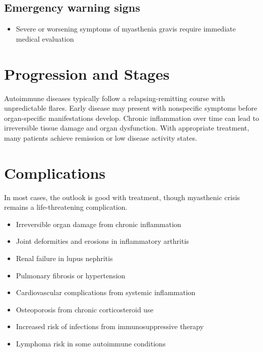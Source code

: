 \subsection{Emergency warning signs}
\begin{itemize}[noitemsep]
  \item Severe or worsening symptoms of myasthenia gravis require immediate medical evaluation
\end{itemize}
\section{Progression and Stages}
Autoimmune diseases typically follow a relapsing-remitting course with unpredictable flares. Early disease may present with nonspecific symptoms before organ-specific manifestations develop. Chronic inflammation over time can lead to irreversible tissue damage and organ dysfunction. With appropriate treatment, many patients achieve remission or low disease activity states.
\section{Complications}
In most cases, the outlook is good with treatment, though myasthenic crisis remains a life-threatening complication.

\begin{itemize}[noitemsep]
  \item Irreversible organ damage from chronic inflammation
  \item Joint deformities and erosions in inflammatory arthritis
  \item Renal failure in lupus nephritis
  \item Pulmonary fibrosis or hypertension
  \item Cardiovascular complications from systemic inflammation
  \item Osteoporosis from chronic corticosteroid use
  \item Increased risk of infections from immunosuppressive therapy
  \item Lymphoma risk in some autoimmune conditions
\end{itemize}
